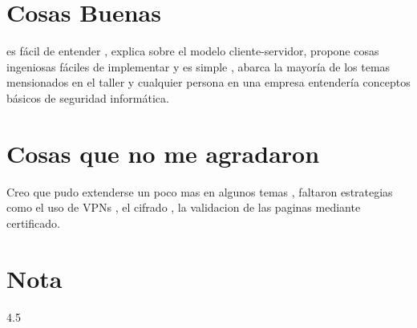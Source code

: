 \documentclass[10pt,a4paper]{article} %
\begin{document}
    \title{\rmfamily\normalfont{}}
    \author{}
    \date{\today} 
    
    \maketitle
     

    \section{Cosas Buenas}
        es fácil de entender , explica sobre el modelo cliente-servidor,
        propone cosas ingeniosas fáciles de implementar
        y es simple , abarca la mayoría de los temas mensionados en el taller y
        cualquier persona en una empresa entendería conceptos
        básicos de seguridad informática.

    \section{Cosas que no me agradaron}
       Creo que pudo extenderse un poco mas en algunos temas , faltaron
       estrategias como el uso de VPNs , el cifrado , la  validacion de las
       paginas mediante certificado.
    
    \section{Nota}
        4.5

    







    
    \nocite{*}
    
    
\end{document}
